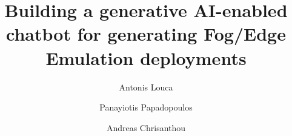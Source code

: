 \documentclass[sigconf]{acmart}
\begin{document}
\title{Building a generative AI-enabled chatbot for generating Fog/Edge
  Emulation deployments}

\author{Antonis Louca}

\author{Panayiotis Papadopoulos}

\author{Andreas Chrisanthou}



\begin{abstract}
  
\end{abstract}


\maketitle









\end{document}
